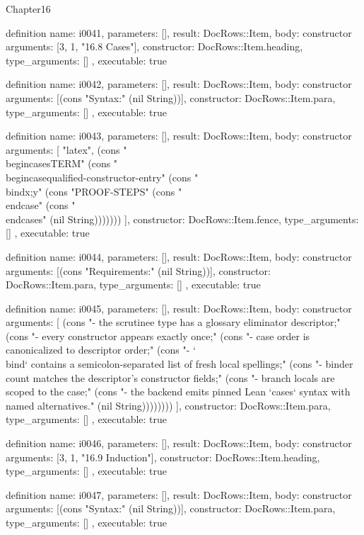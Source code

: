 \begin{lexlean}{Chapter16}
\begin{semanticmodule}
definition{
  name: i0041,
  parameters: [],
  result: DocRows::Item,
  body: constructor{
    arguments: [3, 1, "16.8 Cases"],
    constructor: DocRows::Item.heading,
    type_arguments: []
  },
  executable: true
}

definition{
  name: i0042,
  parameters: [],
  result: DocRows::Item,
  body: constructor{
    arguments: [(cons "Syntax:" (nil String))],
    constructor: DocRows::Item.para,
    type_arguments: []
  },
  executable: true
}

definition{
  name: i0043,
  parameters: [],
  result: DocRows::Item,
  body: constructor{
    arguments: [
      "latex",
      (cons "\\begin{cases}{TERM}" (cons "\\begin{case}{qualified-constructor-entry}" (cons "\\bind{x;y}" (cons "PROOF-STEPS" (cons "\\end{case}" (cons "\\end{cases}" (nil String)))))))
    ],
    constructor: DocRows::Item.fence,
    type_arguments: []
  },
  executable: true
}

definition{
  name: i0044,
  parameters: [],
  result: DocRows::Item,
  body: constructor{
    arguments: [(cons "Requirements:" (nil String))],
    constructor: DocRows::Item.para,
    type_arguments: []
  },
  executable: true
}

definition{
  name: i0045,
  parameters: [],
  result: DocRows::Item,
  body: constructor{
    arguments: [
      (cons "- the scrutinee type has a glossary eliminator descriptor;" (cons "- every constructor appears exactly once;" (cons "- case order is canonicalized to descriptor order;" (cons "- `\\bind{}` contains a semicolon-separated list of fresh local spellings;" (cons "- binder count matches the descriptor's constructor fields;" (cons "- branch locals are scoped to the case;" (cons "- the backend emits pinned Lean `cases` syntax with named alternatives." (nil String))))))))
    ],
    constructor: DocRows::Item.para,
    type_arguments: []
  },
  executable: true
}

definition{
  name: i0046,
  parameters: [],
  result: DocRows::Item,
  body: constructor{
    arguments: [3, 1, "16.9 Induction"],
    constructor: DocRows::Item.heading,
    type_arguments: []
  },
  executable: true
}

definition{
  name: i0047,
  parameters: [],
  result: DocRows::Item,
  body: constructor{
    arguments: [(cons "Syntax:" (nil String))],
    constructor: DocRows::Item.para,
    type_arguments: []
  },
  executable: true
}


\end{semanticmodule}
\end{lexlean}

